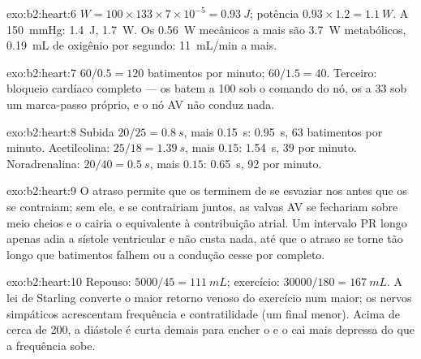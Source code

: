 \begin{solution}{exo:b2:heart:6}
$W = 100\times 133\times 7\times 10^{-5} = \qty{0.93}{J}$; potência
$0.93\times 1.2 = \qty{1.1}{W}$. A \qty{150}{mmHg}: \qty{1.4}{J},
\qty{1.7}{W}. Os \qty{0.56}{W} mecânicos a mais são \qty{3.7}{W}
metabólicos, \qty{0.19}{mL} de oxigênio por segundo: \qty{11}{mL/min} a
mais.
\end{solution}

\begin{solution}{exo:b2:heart:7}
$60/0.5 = 120$ batimentos por minuto; $60/1.5 = 40$. Terceiro: bloqueio
cardíaco completo --- os  batem a 100 sob o comando do nó, os
 a 33 sob um marca-passo próprio, e o nó AV não conduz nada.
\end{solution}

\begin{solution}{exo:b2:heart:8}
Subida $20/25 = \qty{0.8}{s}$, mais \qty{0.15}{s}: \qty{0.95}{s}, 63
batimentos por minuto. Acetilcolina: $25/18 = \qty{1.39}{s}$, mais
$0.15$: \qty{1.54}{s}, 39 por minuto. Noradrenalina:
$20/40 = \qty{0.5}{s}$, mais $0.15$: \qty{0.65}{s}, 92 por minuto.
\end{solution}

\begin{solution}{exo:b2:heart:9}
O atraso permite que os  terminem de se esvaziar nos 
antes que os  se contraiam; sem ele,  e  se
contrairiam juntos, as valvas AV se fechariam sobre  meio
cheios e o  cairia o equivalente à contribuição atrial.
Um intervalo PR longo apenas adia a sístole ventricular e não custa
nada, até que o atraso se torne tão longo que batimentos falhem ou a
condução cesse por completo.
\end{solution}

\begin{solution}{exo:b2:heart:10}
Repouso: $5000/45 = \qty{111}{mL}$; exercício: $\num{30000}/180 =
\qty{167}{mL}$. A lei de Starling converte o maior retorno venoso do
exercício num  maior; os nervos simpáticos acrescentam
frequência e contratilidade (um  final menor). Acima de
cerca de 200, a diástole é curta demais para encher o  e o
 cai mais depressa do que a frequência sobe.
\end{solution}

